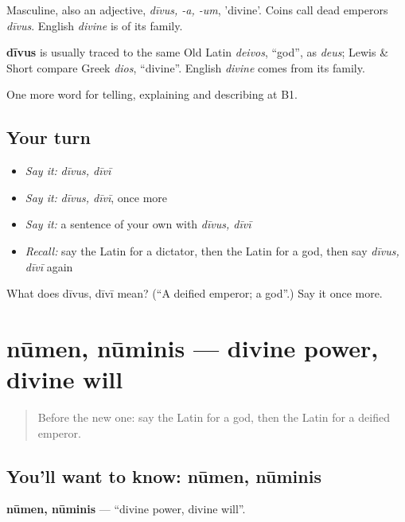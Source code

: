 Masculine, also an adjective, \emph{dīvus, -a, -um}, 'divine'. Coins call dead emperors \emph{dīvus}. English \emph{divine} is of its family.

\begin{cousinweb}
\textbf{dīvus} is usually traced to the same Old Latin \emph{deivos}, \textquotedblleft{}god\textquotedblright{}, as \emph{deus}; Lewis \& Short compare Greek \emph{dios}, \textquotedblleft{}divine\textquotedblright{}. English \emph{divine} comes from its family.
\end{cousinweb}

\begin{grammarlens}[title={What you've built}]
One more word for telling, explaining and describing at B1.
\end{grammarlens}

\subsection*{Your turn}
\begin{itemize}
\raggedright
  \item \emph{Say it:} \emph{dīvus, dīvī}
  \item \emph{Say it:} \emph{dīvus, dīvī}, once more
  \item \emph{Say it:} a sentence of your own with \emph{dīvus, dīvī}
  \item \emph{Recall:} say the Latin for a dictator, then the Latin for a god, then say \emph{dīvus, dīvī} again
\end{itemize}

\begin{tcolorbox}[breakable,colback=teal!4,colframe=teal!35!black,title={Before you move on}]
What does dīvus, dīvī mean? (\textquotedblleft{}A deified emperor; a god\textquotedblright{}.) Say it once more.
\end{tcolorbox}
\section[nūmen, nūminis]{nūmen, nūminis — divine power, divine will}

\label{lesson:LA-C346-numen}



\begin{quote}
Before the new one: say the Latin for a god, then the Latin for a deified emperor.
\end{quote}

\subsection*{You'll want to know: nūmen, nūminis}
\textbf{nūmen, nūminis} — \textquotedblleft{}divine power, divine will\textquotedblright{}.

